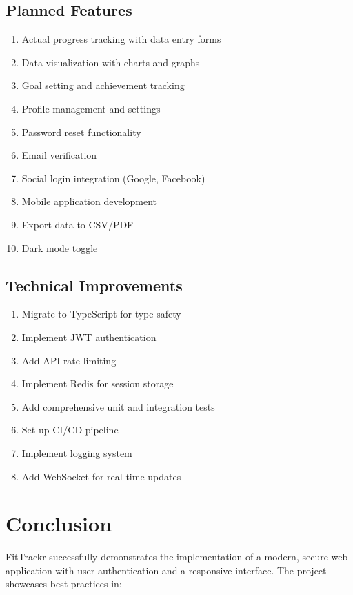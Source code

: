 \documentclass[12pt,a4paper]{article}
\begin{document}
\subsection{Planned Features}
\begin{enumerate}
    \item Actual progress tracking with data entry forms
    \item Data visualization with charts and graphs
    \item Goal setting and achievement tracking
    \item Profile management and settings
    \item Password reset functionality
    \item Email verification
    \item Social login integration (Google, Facebook)
    \item Mobile application development
    \item Export data to CSV/PDF
    \item Dark mode toggle
\end{enumerate}

\subsection{Technical Improvements}
\begin{enumerate}
    \item Migrate to TypeScript for type safety
    \item Implement JWT authentication
    \item Add API rate limiting
    \item Implement Redis for session storage
    \item Add comprehensive unit and integration tests
    \item Set up CI/CD pipeline
    \item Implement logging system
    \item Add WebSocket for real-time updates
\end{enumerate}

\section{Conclusion}

FitTrackr successfully demonstrates the implementation of a modern, secure web application with user authentication and a responsive interface. The project showcases best practices in:
\end{document}
